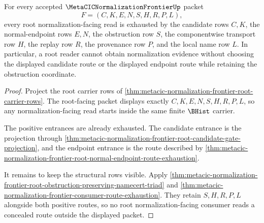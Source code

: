 \begin{theorem}
\label{thm:metacic-normalization-frontier-root-normalization-gate-exhaustion}
For every accepted $\MetaCICNormalizationFrontierUp$ packet
$$
F=(C,K,E,N,S,H,R,P,L),
$$
every root normalization-facing read is exhausted by the candidate rows $C,K$, the normal-endpoint rows $E,N$, the obstruction row $S$, the componentwise transport row $H$, the replay row $R$, the provenance row $P$, and the local name row $L$. In particular, a root reader cannot obtain normalization evidence without choosing the displayed candidate route or the displayed endpoint route while retaining the obstruction coordinate.
\end{theorem}
\begin{proof}
Project the root carrier rows of \autoref{thm:metacic-normalization-frontier-root-carrier-rows}. The root-facing packet displays exactly $C,K,E,N,S,H,R,P,L$, so any normalization-facing read starts inside the same finite $\BHist$ carrier.

The positive entrances are already exhausted. The candidate entrance is the projection through \autoref{thm:metacic-normalization-frontier-root-candidate-gate-projection}, and the endpoint entrance is the route described by \autoref{thm:metacic-normalization-frontier-root-normal-endpoint-route-exhaustion}.

It remains to keep the structural rows visible. Apply \autoref{thm:metacic-normalization-frontier-root-obstruction-preserving-namecert-triad} and \autoref{thm:metacic-normalization-frontier-consumer-route-exhaustion}. They retain $S,H,R,P,L$ alongside both positive routes, so no root normalization-facing consumer reads a concealed route outside the displayed packet.
\end{proof}

